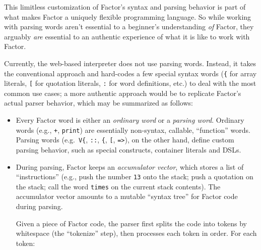 \documentclass[
]{article}
\begin{document}
\begin{itemize}
  This limitless customization of Factor's syntax and parsing behavior
  is part of what makes Factor a uniquely flexible programming language.
  So while working with parsing words aren't essential to a beginner's
  understanding \emph{of} Factor, they arguably \emph{are} essential to
  an authentic experience of what it is like to work with Factor.

  Currently, the web-based interpreter does not use parsing words.
  Instead, it takes the conventional approach and hard-codes a few
  special syntax words (\texttt{\{} for array literals, \texttt{{[}} for
  quotation literals, \texttt{:} for word definitions, etc.) to deal
  with the most common use cases; a more authentic approach would be to
  replicate Factor's actual parser behavior, which may be summarized as
  follows:

  \begin{itemize}
  \item
    Every Factor word is either an \emph{ordinary word} or a
    \emph{parsing word}. Ordinary words (e.g., \texttt{+},
    \texttt{print}) are essentially non-syntax, callable, ``function''
    words. Parsing words (e.g.~\texttt{V\{}, \texttt{::}, \texttt{\{},
    \texttt{{[}}, \texttt{=\textgreater{}}), on the other hand, define
    custom parsing behavior, such as special constructs, container
    literals and DSLs.
  \item
    During parsing, Factor keeps an \emph{accumulator vector}, which
    stores a list of ``instructions'' (e.g., push the number \texttt{13}
    onto the stack; push a quotation on the stack; call the word
    \texttt{times} on the current stack contents). The accumulator
    vector amounts to a mutable ``syntax tree'' for Factor code during
    parsing.

    Given a piece of Factor code, the parser first splits the code into
    tokens by whitespace (the ``tokenize'' step), then processes each
    token in order. For each token:


\end{itemize}
\end{itemize}
\end{document}
